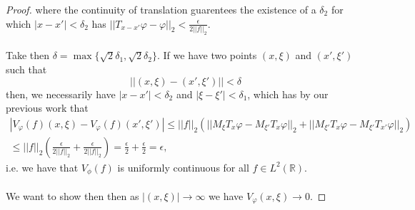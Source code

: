 \documentclass[12pt]{article}
\newenvironment{ex}[2][Exercise]{\begin{trivlist}
\item[\hskip \labelsep {\bfseries #1}\hskip \labelsep {\bfseries #2.}]}{\end{trivlist}}
\begin{document}
\begin{ex}{16}
\begin{enumerate}[label=(\alph*)]
\begin{proof}
            where the continuity of translation guarentees the existence of a $\delta_2$ for which $|x - x'| < \delta_2$ has $||T_{x - x'}\varphi - \varphi||_2 < \frac{\epsilon}{2||f||_2}$. \\ \\
            Take then $\delta = \max\{\sqrt{2}\delta_1, \sqrt{2}\delta_2\}$. If we have two points $(x, \xi)$ and $(x', \xi')$ such that 
            $$||(x, \xi) - (x', \xi')|| < \delta$$
            then, we necessarily have $|x - x'| < \delta_2$ and $|\xi - \xi'| < \delta_1$, which has by our previous work that 
            \begin{align*}
                |V_\varphi(f)(x, \xi) - V_\varphi(f)(x', \xi')| \leq ||f||_2(||M_\xi T_x \varphi - M_{\xi'} T_{x} \varphi||_2 + ||M_{\xi'} T_{x}\varphi - M_{\xi'}T_{x'}\varphi||_2) \\
                \leq ||f||_2(\frac{\epsilon}{2||f||_2} + \frac{\epsilon}{2||f||_2}) = \frac{\epsilon}{2} + \frac{\epsilon}{2} = \epsilon,
            \end{align*}
            i.e. we have that $V_\phi(f)$ is uniformly continuous for all $f \in L^2(\mathbb{R})$. 
            \\ \\
            We want to show then then as $|(x, \xi)| \rightarrow \infty$ we have $V_\varphi(x, \xi) \rightarrow 0$. 
           
        \end{proof}
    \end{enumerate}
\end{ex}
\end{document}
